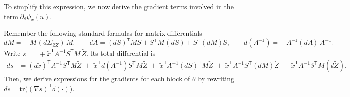 \documentclass[12pt]{article}
\newcommand{\T}{\mathsf{T}} %
\begin{document}
To simplify this expression, we now derive the gradient terms involved in the term $\partial_\theta\psi_x(u)$.


Remember the following standard formulas for matrix differentials,
\[
dM = -\,M\,(d\Sigma_{ZZ})\,M,\qquad
dA = (dS)^{\T}MS + S^{\T}M\,(dS) + S^{\T}(dM)S,\qquad
d(A^{-1}) = -\,A^{-1}(dA)\,A^{-1}.
\]
Write $s=1+\tilde x^{\T}A^{-1}S^{\T}M\,\widetilde Z$. Its total differential is
\begin{align*}
ds &= (d\tilde x)^{\T}A^{-1}S^{\T}M\widetilde Z
\;+\;\tilde x^{\T} d(A^{-1}) S^{\T}M\widetilde Z
\;+\;\tilde x^{\T} A^{-1} (dS)^{\T}M\widetilde Z
\;+\;\tilde x^{\T} A^{-1} S^{\T} (dM)\widetilde Z
\;+\;\tilde x^{\T} A^{-1} S^{\T} M (d\widetilde Z).
\end{align*}
Then, we derive expressions for the gradients for each block of $\theta$ by rewriting $ds=\mathrm{tr}\big((\nabla s)^{\T} d(\cdot)\big)$.
\end{document}
